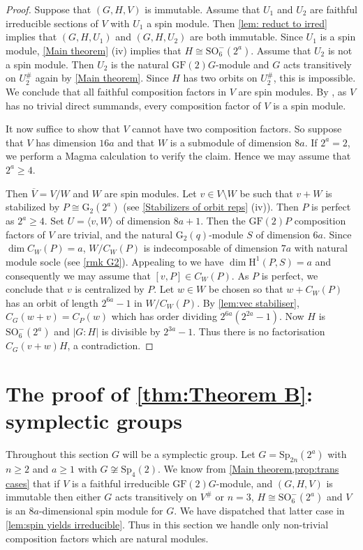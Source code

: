 \documentclass[12pt]{amsart}
\theoremstyle{remark}
\theoremstyle{notation}
\theoremstyle{definition}
\newcommand{\G}{\mathrm{G}}
\newcommand{\GF}{\mathrm{GF}}
\newcommand{\Sp}{\mathrm{Sp}}
\newcommand{\0}{\emptyset}
\newcommand{\SO}{\mathrm{SO}}
\begin{document}
\begin{proof}   Suppose that $(G,H,V)$ is immutable. Assume that $U_1$ and $U_2$ are faithful irreducible sections of $V$ with $U_1$ a spin module. Then \cref{lem: reduct to irred} implies that $(G,H,U_1)$ and $(G,H,U_2)$ are both immutable. Since $U_1$ is a spin module, \cref{Main theorem} (iv) implies that $H \cong \SO_6^-(2^a )$.  Assume that $U_2$ is not a spin module.  Then $U_2$ is the natural $\GF(2)G$-module and $G$ acts transitively on $U_2^\#$ again by \cref{Main theorem}. Since $H$ has two orbits on $U_2^\#$, this is impossible. We conclude that all faithful composition factors in $V$ are spin modules.
 By \cite[Table B]{JonesParshall}, as $V$ has no trivial direct summands, every composition factor of $V$ is a spin module.

 It now suffice to show that $V$ cannot have two composition factors. So suppose that $V$ has dimension $16a$ and that $W$ is a submodule of dimension $8a$.  If $2^a=2$, we perform a {\sc Magma} calculation to verify the claim. Hence we may assume that $2^a\ge 4$.


 Then $\overline V= V/W$ and $W$ are spin modules. Let $v \in V \setminus W$ be such that $ v+W$ is stabilized by $P\cong \G_2(2^a)$ (see \cref{Stabilizers of orbit reps} (iv)). Then $P$ is perfect as $2^a\ge 4$. Set $U= \langle v,W\rangle$ of dimension $8a+1$.  Then the $\GF(2)P$ composition factors of $V$ are trivial, and the natural $\mathrm G_2(q)$-module $S$ of dimension $6a$.  Since $\dim C_W(P)=a$, $W/C_W(P)$ is indecomposable of dimension $7a$ with natural module socle (see \cref{rmk G2}). Appealing to \cite[Table B]{JonesParshall} we have $\dim \mathrm H^1(P,S)=a$ and consequently we may assume that $[v,P] \in C_W(P)$.  As $P$ is perfect, we conclude that $v$ is centralized by $P$.
Let $w \in W$ be chosen so that $w+C_W(P)$ has an orbit of length $2^{6a}-1$ in $W/C_W(P)$. By \cref{lem:vec stabiliser}, $C_G(w+v)=C_P(w)$ which has order dividing $2^{6a}(2^{2a}-1)$. Now $H$ is $\SO_6^-(2^a)$ and $|G:H|$ is divisible by $2^{3a}-1$. Thus there is no factorisation $C_G(v+w)H$, a contradiction.
\end{proof}



\section{The proof of \cref{thm:Theorem B}: symplectic groups}\label{sec:ThmBSymp}


Throughout this section $G$ will be a symplectic group. Let $G=\Sp_{2n}(2^a)$ with $n \ge 2$  and $a\ge 1$ with $G \not\cong \Sp_4(2)$.  We know from \cref{Main theorem,prop:trans cases} that if $V$ is a faithful irreducible $\GF(2)G$-module, and $(G,H,V)$ is immutable then either  $G$ acts transitively on $V^\#$ or $n=3$, $H \cong \SO_6^-(2^a)$ and $V$ is an $8a$-dimensional spin module for $G$. We have dispatched that latter case in \cref{lem:spin yields irreducible}. Thus in this section we handle only non-trivial composition factors which are natural modules.
\end{document}
